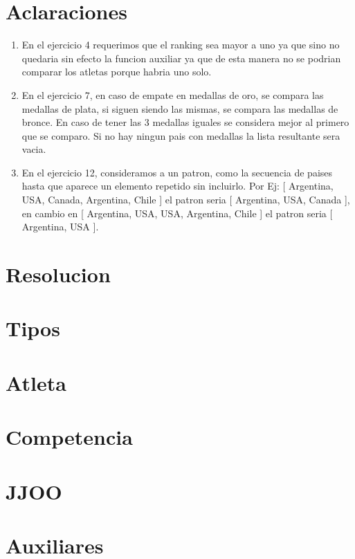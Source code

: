 \documentclass[10pt,titlepage,a4paper]{article}
\begin{document}
\maketitle

\newpage

\section{Aclaraciones}

\begin{enumerate}
\item
En el ejercicio 4 requerimos que el ranking sea mayor a uno ya que 
sino no quedaria sin efecto la funcion auxiliar ya que de esta manera 
no se podrian comparar los atletas porque habria uno solo.

\item
En el ejercicio 7, en caso de empate en medallas de oro, se compara las medallas de plata, si siguen siendo las mismas, se compara las medallas de bronce. En caso de tener las 3 medallas iguales se considera mejor al primero que se comparo.
Si no hay ningun pais con medallas la lista resultante sera vacia.

\item
En el ejercicio 12, consideramos a un patron, como la secuencia de paises hasta que aparece un elemento repetido sin incluirlo. Por Ej: [ Argentina, USA, Canada, Argentina, Chile ] el patron seria [ Argentina, USA, Canada ], en cambio en [ Argentina, USA, USA, Argentina, Chile ] el patron seria [ Argentina, USA ].
\end{enumerate}

\section{Resolucion}

\begin{enumerate}






\end{enumerate}

\newpage

\section{Tipos}



\section{Atleta}


\section{Competencia}



\section{JJOO}


\section{Auxiliares}


\end{document}
